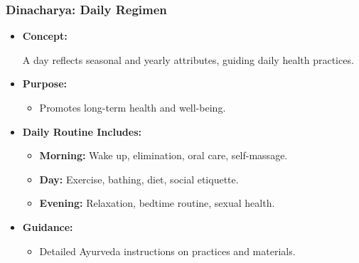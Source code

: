 \begin{frame}[fragile]\frametitle{Dinacharya: Daily Regimen}

      \begin{itemize}
        \item \textbf{Concept:} 
        
        A day reflects seasonal and yearly attributes, guiding daily health practices.
        
        \item \textbf{Purpose:} 
        \begin{itemize}
            \item Promotes long-term health and well-being.
        \end{itemize}
        \item \textbf{Daily Routine Includes:}
        \begin{itemize}
            \item \textbf{Morning:} Wake up, elimination, oral care, self-massage.
            \item \textbf{Day:} Exercise, bathing, diet, social etiquette.
            \item \textbf{Evening:} Relaxation, bedtime routine, sexual health.
        \end{itemize}
        \item \textbf{Guidance:} 
        \begin{itemize}
            \item Detailed Ayurveda instructions on practices and materials.
        \end{itemize}
      \end{itemize}

\end{frame}

